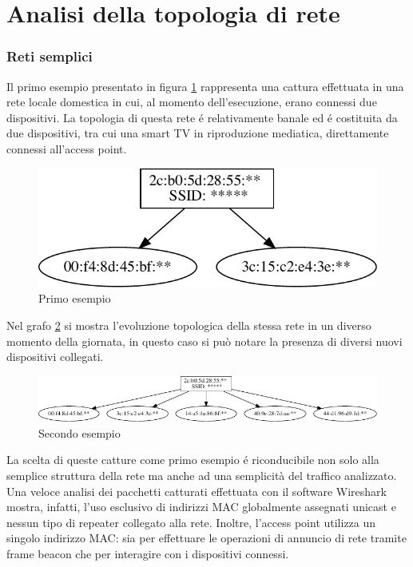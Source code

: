 \section{Analisi della topologia di rete}
\subsubsection{Reti semplici}

Il primo esempio presentato in figura \ref{fig:es1} rappresenta una cattura effettuata in una rete locale domestica in cui, al momento dell'esecuzione, erano connessi due dispositivi.
La topologia di questa rete \'e relativamente banale ed \'e costituita da due dispositivi, tra cui una smart TV in riproduzione mediatica, direttamente connessi all'access point.

\begin{figure}[!h]
	\centering
	\includegraphics{images/img8censored.pdf}
	\caption{Primo esempio}
	\label{fig:es1}
\end{figure}


Nel grafo \ref{fig:es2} si mostra l'evoluzione topologica della stessa rete in un diverso momento della giornata, in questo caso si pu\`o notare la presenza di diversi nuovi dispositivi collegati.
\begin{figure}[!h]
	\centering
	\includegraphics{images/img9censored.pdf}
	\caption{Secondo esempio}
	\label{fig:es2}
\end{figure}

La scelta di queste catture come primo esempio \'e riconducibile non solo alla semplice struttura della rete ma anche ad una semplicit\`a del traffico analizzato.
Una veloce analisi dei pacchetti catturati effettuata con il software Wireshark mostra, infatti, l'uso esclusivo di indirizzi MAC globalmente assegnati unicast e nessun tipo di repeater collegato alla rete.
Inoltre, l'access point utilizza un singolo indirizzo MAC: sia per effettuare le operazioni di annuncio di rete tramite frame beacon che per interagire con i dispositivi connessi.

